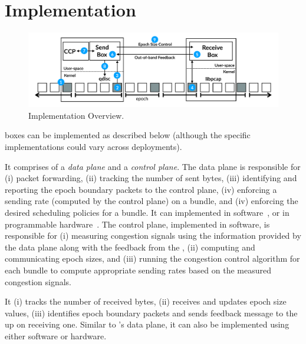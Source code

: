 \section{Implementation}\label{s:impl}
\begin{figure}[t]
    \centering
    \includegraphics[width=2\columnwidth]{img/bundler-diagram}
    \caption{\name Implementation Overview.}\label{fig:bundler}
\end{figure}


\name boxes can be implemented as described below (although the specific implementations could vary across deployments).

\Para{\capinbox} It comprises of a \emph{data plane} and a \emph{control plane}. The data plane is responsible for (i) packet forwarding, (ii) tracking the number of sent bytes, (iii) identifying and reporting the epoch boundary packets to the control plane, (iv) enforcing a sending rate (computed by the control plane) on a bundle, and (iv) enforcing the desired scheduling policies for a bundle. It can implemented in software~\cite{bess, click, mos, netbricks, tc}, or in programmable hardware~\cite{p4}. The control plane, implemented in software, is responsible for (i) measuring congestion signals using the information provided by the data plane along with the feedback from the \outbox, (ii) computing and communicating epoch sizes, and (iii) running the congestion control algorithm for each bundle to compute appropriate sending rates based on the measured congestion signals. 

\Para{\capoutbox} It (i) tracks the number of received bytes, (ii) receives and updates epoch size values, (iii) identifies epoch boundary packets and sends feedback message to the \inbox up on receiving one. Similar to \inbox's data plane, it can also be implemented using either software or hardware.


